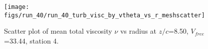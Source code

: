 \begin{figure}[H]
\centering
\texttt{[image: figs/run\_40/run\_40\_turb\_visc\_by\_vtheta\_vs\_r\_meshscatter]}
\caption{Scatter plot of mean total viscosity $\nu$ vs radius at $z/c$=8.50, $V_{free}$=33.44, station 4.}
\label{fig:run_40_turb_visc_by_vtheta_vs_r_meshscatter}
\end{figure}


